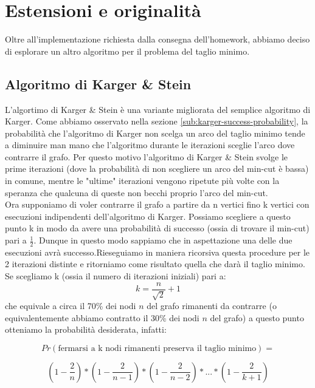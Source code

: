 \section{Estensioni e originalità}
\label{cap:extensions-and-originalities}

\noindent Oltre all'implementazione richiesta dalla consegna
dell'homework, abbiamo deciso di esplorare un altro algoritmo per il problema del taglio minimo.

\subsection{Algoritmo di Karger \& Stein}
\label{sub:karger-stein-algorithm}

L'algortimo di Karger \& Stein è una variante migliorata del semplice algoritmo di Karger. Come abbiamo osservato nella sezione \ref{sub:karger-success-probability}, la probabilità che l'algoritmo di Karger non scelga un arco del taglio minimo tende a diminuire man mano che l'algoritmo durante le iterazioni sceglie l'arco dove contrarre il grafo. Per questo motivo l'algoritmo di Karger \& Stein svolge le prime iterazioni (dove la probabilità di non scegliere un arco del min-cut è bassa) in comune, mentre le "ultime" iterazioni vengono ripetute più volte con la speranza che qualcuna di queste non becchi proprio l'arco del min-cut. \\

\noindent Ora supponiamo di voler contrarre il grafo a partire da n vertici fino k vertici con esecuzioni indipendenti dell'algoritmo di Karger. Possiamo scegliere a questo punto k in modo da avere una probabilità di successo (ossia di trovare il min-cut) pari a $\frac{1}{2}$. Dunque in questo modo sappiamo che in aspettazione una delle due esecuzioni avrà successo.Rieseguiamo in maniera ricorsiva questa procedure per le 2 iterazioni distinte e ritorniamo come risultato quella che darà il taglio minimo. \\

\noindent Se scegliamo k (ossia il numero di iterazioni iniziali) pari a:
$$ k = \dfrac{n}{\sqrt{2}} + 1$$
che equivale a circa il 70\% dei nodi $n$ del grafo rimanenti da contrarre (o equivalentemente abbiamo contratto il 30\% dei nodi $n$ del grafo) a questo punto otteniamo la probabilità desiderata, infatti:

$$ Pr(\text{fermarsi a k nodi rimanenti preserva il taglio minimo}) =$$

$$\left( 1 - \frac{2}{n} \right) * \left( 1 - \frac{2}{n-1} \right) * \left( 1 - \frac{2}{n-2} \right) * ... * \left( 1 - \frac{2}{k+1} \right) $$

